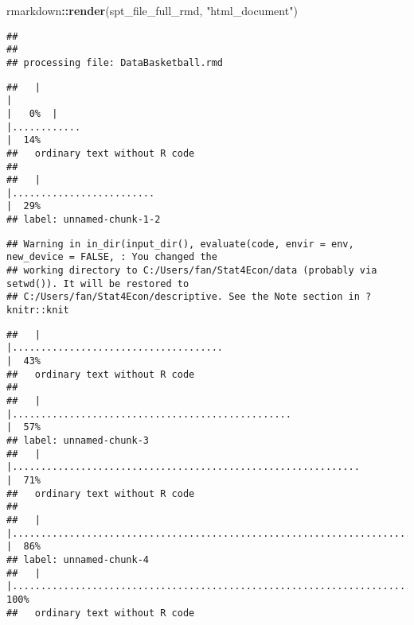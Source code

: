 \documentclass[
]{article}
\newenvironment{Shaded}{\begin{snugshade}}{\end{snugshade}}
\newcommand{\KeywordTok}[1]{\textcolor[rgb]{0.13,0.29,0.53}{\textbf{#1}}}
\newcommand{\NormalTok}[1]{#1}
\newcommand{\OperatorTok}[1]{\textcolor[rgb]{0.81,0.36,0.00}{\textbf{#1}}}
\newcommand{\StringTok}[1]{\textcolor[rgb]{0.31,0.60,0.02}{#1}}
\begin{document}
\begin{Shaded}
\begin{Highlighting}[]
\NormalTok{rmarkdown}\OperatorTok{::}\KeywordTok{render}\NormalTok{(spt_file_full_rmd, }\StringTok{"html_document"}\NormalTok{)}
\end{Highlighting}
\end{Shaded}

\begin{verbatim}
## 
## 
## processing file: DataBasketball.rmd
\end{verbatim}

\begin{verbatim}
##   |                                                                                              |                                                                                      |   0%  |                                                                                              |............                                                                          |  14%
##   ordinary text without R code
## 
##   |                                                                                              |.........................                                                             |  29%
## label: unnamed-chunk-1-2
\end{verbatim}

\begin{verbatim}
## Warning in in_dir(input_dir(), evaluate(code, envir = env, new_device = FALSE, : You changed the
## working directory to C:/Users/fan/Stat4Econ/data (probably via setwd()). It will be restored to
## C:/Users/fan/Stat4Econ/descriptive. See the Note section in ?knitr::knit
\end{verbatim}

\begin{verbatim}
##   |                                                                                              |.....................................                                                 |  43%
##   ordinary text without R code
## 
##   |                                                                                              |.................................................                                     |  57%
## label: unnamed-chunk-3
##   |                                                                                              |.............................................................                         |  71%
##   ordinary text without R code
## 
##   |                                                                                              |..........................................................................            |  86%
## label: unnamed-chunk-4
##   |                                                                                              |......................................................................................| 100%
##   ordinary text without R code
\end{verbatim}
\end{document}
